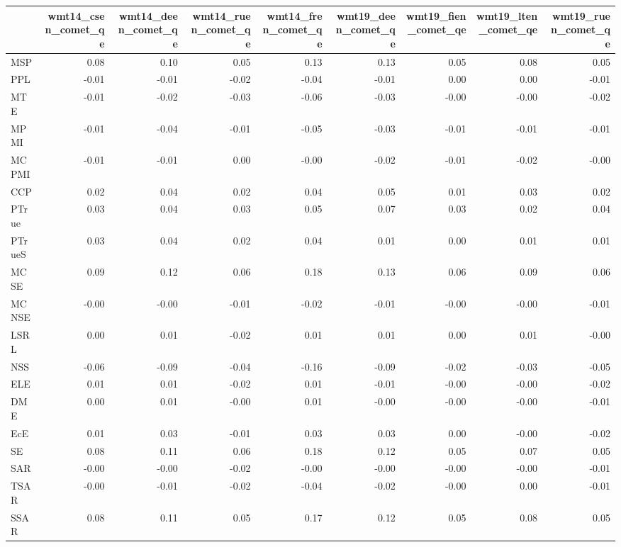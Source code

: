 \begin{tabular}{lrrrrrrrr}
\toprule
 & wmt14\_csen\_comet\_qe & wmt14\_deen\_comet\_qe & wmt14\_ruen\_comet\_qe & wmt14\_fren\_comet\_qe & wmt19\_deen\_comet\_qe & wmt19\_fien\_comet\_qe & wmt19\_lten\_comet\_qe & wmt19\_ruen\_comet\_qe \\
\midrule
MSP & 0.08 & 0.10 & 0.05 & 0.13 & 0.13 & 0.05 & 0.08 & 0.05 \\
PPL & -0.01 & -0.01 & -0.02 & -0.04 & -0.01 & 0.00 & 0.00 & -0.01 \\
MTE & -0.01 & -0.02 & -0.03 & -0.06 & -0.03 & -0.00 & -0.00 & -0.02 \\
MPMI & -0.01 & -0.04 & -0.01 & -0.05 & -0.03 & -0.01 & -0.01 & -0.01 \\
MCPMI & -0.01 & -0.01 & 0.00 & -0.00 & -0.02 & -0.01 & -0.02 & -0.00 \\
CCP & 0.02 & 0.04 & 0.02 & 0.04 & 0.05 & 0.01 & 0.03 & 0.02 \\
PTrue & 0.03 & 0.04 & 0.03 & 0.05 & 0.07 & 0.03 & 0.02 & 0.04 \\
PTrueS & 0.03 & 0.04 & 0.02 & 0.04 & 0.01 & 0.00 & 0.01 & 0.01 \\
MCSE & 0.09 & 0.12 & 0.06 & 0.18 & 0.13 & 0.06 & 0.09 & 0.06 \\
MCNSE & -0.00 & -0.00 & -0.01 & -0.02 & -0.01 & -0.00 & -0.00 & -0.01 \\
LSRL & 0.00 & 0.01 & -0.02 & 0.01 & 0.01 & 0.00 & 0.01 & -0.00 \\
NSS & -0.06 & -0.09 & -0.04 & -0.16 & -0.09 & -0.02 & -0.03 & -0.05 \\
ELE & 0.01 & 0.01 & -0.02 & 0.01 & -0.01 & -0.00 & -0.00 & -0.02 \\
DME & 0.00 & 0.01 & -0.00 & 0.01 & -0.00 & -0.00 & -0.00 & -0.01 \\
EcE & 0.01 & 0.03 & -0.01 & 0.03 & 0.03 & 0.00 & -0.00 & -0.02 \\
SE & 0.08 & 0.11 & 0.06 & 0.18 & 0.12 & 0.05 & 0.07 & 0.05 \\
SAR & -0.00 & -0.00 & -0.02 & -0.00 & -0.00 & -0.00 & -0.00 & -0.01 \\
TSAR & -0.00 & -0.01 & -0.02 & -0.04 & -0.02 & -0.00 & 0.00 & -0.01 \\
SSAR & 0.08 & 0.11 & 0.05 & 0.17 & 0.12 & 0.05 & 0.08 & 0.05 \\
\bottomrule
\end{tabular}
